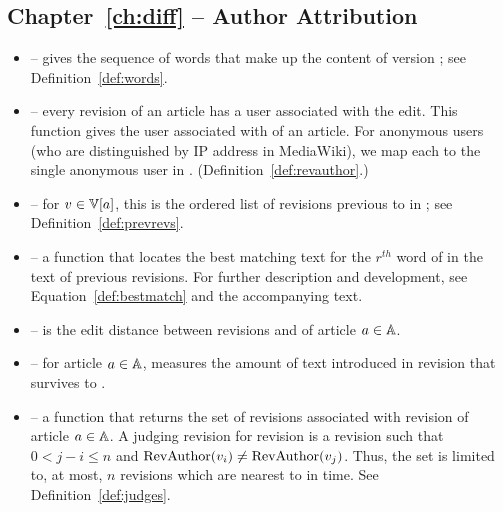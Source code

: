 \subsection{Chapter~\ref{ch:diff} -- Author Attribution}

\begin{itemize}

\item \words{\version{}} -- gives the sequence of words that make
    up the content of version \version{}; see
    Definition~\ref{def:words}.

\item \revauthor{\version{}} -- every revision of an article has
    a user associated with the edit.
    This function gives the user associated with \version{} of
    an article.
    For anonymous users (who are distinguished by IP address in
    MediaWiki), we map each to the single anonymous user in \users.
    (Definition~\ref{def:revauthor}.)

\item \prevrevs{\version{}} -- for $\version{} \in \versions{a}$,
    this is the ordered list of revisions previous to \version{}
    in ; see Definition~\ref{def:prevrevs}.

\item {} -- a function
    that locates the best matching text for the $r^{th}$ word of
     in the text of previous revisions.
    For further description and development, see
    Equation~\ref{def:bestmatch} and the accompanying text.

\item {} -- is the edit distance between revisions
     and  of article $a \in \mathbb{A}$.

\item {} -- for article $a \in \mathbb{A}$, measures the
    amount of text introduced in revision 
    that survives to .

\item {} -- a function that returns the set of
     revisions associated with revision 
    of article $a \in \mathbb{A}$.
    A judging revision for revision  is a revision 
    such that $0 < j - i \le n$ and
    $\mathrm{RevAuthor}(v_{i}) \not= \mathrm{RevAuthor}(v_{j})$.
    Thus, the set is limited to, at most, $n$ revisions which are nearest
    to  in time.  See Definition~\ref{def:judges}.

\end{itemize}

